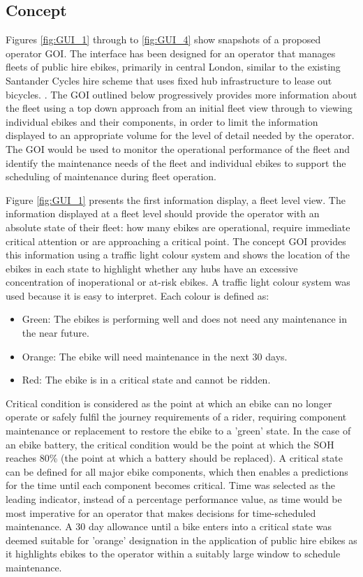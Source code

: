 \documentclass[a4paper, 10pt]{article}
\numberwithin{equation}{section}
\begin{document}
\subsection{Concept}

Figures \ref{fig:GUI_1} through to \ref{fig:GUI_4} show snapshots of a proposed operator GOI. The interface has been designed for an operator that manages fleets of public hire ebikes, primarily in central London, similar to the existing Santander Cycles hire scheme that uses fixed hub infrastructure to lease out bicycles. \cite{web:Santander_bikes}. The GOI outlined below progressively provides more information about the fleet using a top down approach from an initial fleet view through to viewing individual ebikes and their components, in order to limit the information displayed to an appropriate volume for the level of detail needed by the operator. The GOI would be used to monitor the operational performance of the fleet and identify the maintenance needs of the fleet and individual ebikes to support the scheduling of maintenance during fleet operation. 

Figure \ref{fig:GUI_1} presents the first information display, a fleet level view. The information displayed at a fleet level should provide the operator with an absolute state of their fleet: how many ebikes are operational, require immediate critical attention or are approaching a critical point. The concept GOI provides this information using a traffic light colour system and shows the location of the ebikes in each state to highlight whether any hubs have an excessive concentration of inoperational or at-risk ebikes. A traffic light colour system was used because it is easy to interpret. Each colour is defined as:

\begin{itemize}
    \item Green: The ebikes is performing well and does not need any maintenance in the near future.
    \item Orange: The ebike will need maintenance in the next 30 days.
    \item Red: The ebike is in a critical state and cannot be ridden.
\end{itemize}

Critical condition is considered as the point at which an ebike can no longer operate or safely fulfil the journey requirements of a rider, requiring component maintenance or replacement to restore the ebike to a 'green' state. In the case of an ebike battery, the critical condition would be the point at which the SOH reaches 80\% (the point at which a battery should be replaced). A critical state can be defined for all major ebike components, which then enables a predictions for the time until each component becomes critical. Time was selected as the leading indicator, instead of a percentage performance value, as time would be most imperative for an operator that makes decisions for time-scheduled maintenance. A 30 day allowance until a bike enters into a critical state was deemed suitable for 'orange' designation in the application of public hire ebikes as it highlights ebikes to the operator within a suitably large window to schedule maintenance.
\end{document}
